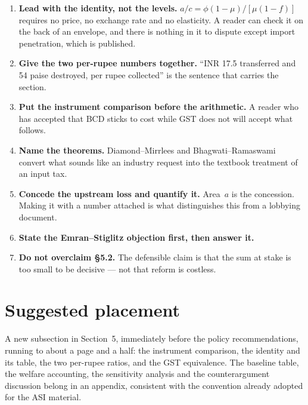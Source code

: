 \documentclass[11pt, a4paper]{article}
\begin{document}
\begin{enumerate}[leftmargin=1.6em, itemsep=4pt]
\item \textbf{Lead with the identity, not the levels.} $a/c = \phi(1-\mu)/[\mu(1-f)]$
requires no price, no exchange rate and no elasticity. A reader can check it on the
back of an envelope, and there is nothing in it to dispute except import penetration,
which is published.

\item \textbf{Give the two per-rupee numbers together.} ``INR 17.5 transferred and
54 paise destroyed, per rupee collected'' is the sentence that carries the section.

\item \textbf{Put the instrument comparison before the arithmetic.} A reader who has
accepted that BCD sticks to cost while GST does not will accept what follows.

\item \textbf{Name the theorems.} Diamond--Mirrlees and Bhagwati--Ramaswami convert
what sounds like an industry request into the textbook treatment of an input tax.

\item \textbf{Concede the upstream loss and quantify it.} Area~$a$ is the concession.
Making it with a number attached is what distinguishes this from a lobbying document.

\item \textbf{State the Emran--Stiglitz objection first, then answer it.}

\item \textbf{Do not overclaim §5.2.} The defensible claim is that the sum at stake is
too small to be decisive --- not that reform is costless.
\end{enumerate}

\section{Suggested placement}

A new subsection in Section~5, immediately before the policy recommendations, running
to about a page and a half: the instrument comparison, the identity and its table,
the two per-rupee ratios, and the GST equivalence. The baseline table, the welfare
accounting, the sensitivity analysis and the counterargument discussion belong in an
appendix, consistent with the convention already adopted for the ASI material.
\end{document}
